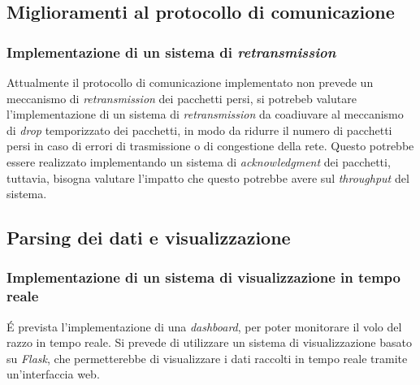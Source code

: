 \documentclass[12pt,a4paper,twoside]{book}
\begin{document}
\subsection{Miglioramenti al protocollo di comunicazione}
\subsubsection{Implementazione di un sistema di \emph{retransmission}}
Attualmente il protocollo di comunicazione implementato non prevede un meccanismo di \emph{retransmission} dei pacchetti persi, 
si potrebeb valutare l'implementazione di un sistema di \emph{retransmission} da coadiuvare al meccanismo di \emph{drop} temporizzato dei pacchetti,
in modo da ridurre il numero di pacchetti persi in caso di errori di trasmissione o di congestione della rete.
Questo potrebbe essere realizzato implementando un sistema di \emph{acknowledgment} dei pacchetti, 
tuttavia, bisogna valutare l'impatto che questo potrebbe avere sul \emph{throughput} del sistema.
\subsection{Parsing dei dati e visualizzazione}
\subsubsection{Implementazione di un sistema di visualizzazione in tempo reale}
\'E prevista l'implementazione di una \emph{dashboard}, per poter monitorare il 
volo del razzo in tempo reale. 
Si prevede di utilizzare un sistema di visualizzazione basato su \emph{Flask}, 
che permetterebbe di visualizzare i dati raccolti in tempo reale tramite un'interfaccia web.
\end{document}

